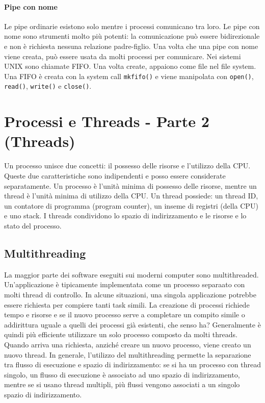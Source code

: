 \documentclass[a4paper]{article}
\begin{document}
\paragraph{Pipe con nome} Le pipe ordinarie esistono solo mentre i processi comunicano tra loro. Le pipe con nome sono strumenti molto più potenti: la comunicazione può essere bidirezionale e non è richiesta nessuna relazione padre-figlio. Una volta che una pipe con nome viene creata, può essere usata da molti processi per comunicare. Nei sistemi UNIX sono chiamate FIFO. Una volta create, appaiono come file nel file system. Una FIFO è creata con la system call \texttt{mkfifo()} e viene manipolata con \texttt{open()}, \texttt{read()}, \texttt{write()} e \texttt{close()}.

\newpage
\section{Processi e Threads - Parte 2 (Threads)}

Un processo unisce due concetti: il possesso delle risorse e l'utilizzo della CPU. Queste due caratteristiche sono indipendenti e posso essere considerate separatamente. \newline
Un processo è l'unità minima di possesso delle risorse, mentre un thread è l'unità minima di utilizzo della CPU. Un thread possiede: un thread ID, un contatore di programma (program counter), un inseme di registri (della CPU) e uno stack. I threads condividono lo spazio di indirizzamento e le risorse e lo stato del processo.

\subsection{Multithreading}
La maggior parte dei software eseguiti sui moderni computer sono multithreaded. Un'applicazione è tipicamente implementata come un processo separaato con molti thread di controllo. In alcune situazioni, una singola applicazione potrebbe essere richiesta per compiere tanti task simili. La creazione di processi richiede tempo e risorse e se il nuovo processo serve a completare un compito simile o addirittura uguale a quelli dei processi già esistenti, che senso ha? Generalmente è quindi più efficiente utilizzare un solo processo composto da molti threads. Quando arriva una richiesta, anziché creare un nuovo processo, viene creato un nuovo thread. In generale, l'utilizzo del multithreading permette la separazione tra flusso di esecuzione e spazio di indirizzamento: se si ha un processo con thread singolo, un flusso di esecuzione è associato ad uno spazio di indirizzamento, mentre se si usano thread multipli, più flussi vengono associati a un singolo spazio di indirizzamento.
\end{document}

